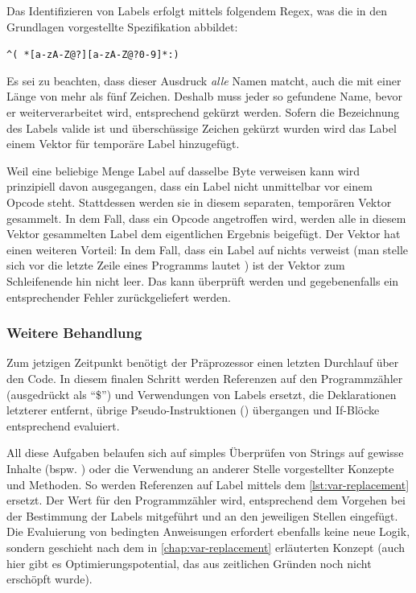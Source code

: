 Das Identifizieren von Labels erfolgt mittels folgendem Regex, was die in den Grundlagen vorgestellte Spezifikation abbildet:

\begin{center}
\texttt{\textasciicircum( *[a-zA-Z@?][a-zA-Z@?0-9]*:)}
\end{center}

Es sei zu beachten, dass dieser Ausdruck \textit{alle} Namen matcht, auch die mit einer Länge von mehr als fünf Zeichen. Deshalb muss jeder so gefundene Name, bevor er weiterverarbeitet wird, entsprechend gekürzt werden. Sofern die Bezeichnung des Labels valide ist und überschüssige Zeichen gekürzt wurden wird das Label einem Vektor für \glqq temporäre\grqq{} Label hinzugefügt.

Weil eine beliebige Menge Label auf dasselbe Byte verweisen kann wird prinzipiell davon ausgegangen, dass ein Label nicht unmittelbar vor einem Opcode steht. Stattdessen werden sie in diesem separaten, \glqq temporären\grqq{} Vektor gesammelt. In dem Fall, dass ein Opcode angetroffen wird, werden alle in diesem Vektor gesammelten Label dem eigentlichen Ergebnis beigefügt. Der Vektor hat einen weiteren Vorteil: In dem Fall, dass ein Label auf nichts verweist (man stelle sich vor die letzte Zeile eines Programms lautet ) ist der Vektor zum Schleifenende hin nicht leer. Das kann überprüft werden und gegebenenfalls ein entsprechender Fehler zurückgeliefert werden.

\subsubsection{Weitere Behandlung}

Zum jetzigen Zeitpunkt benötigt der Präprozessor einen letzten Durchlauf über den Code. In diesem finalen Schritt werden Referenzen auf den Programmzähler (ausgedrückt als \enquote{\$}) und Verwendungen von Labels ersetzt, die Deklarationen letzterer entfernt, übrige Pseudo-Instruktionen () übergangen und If-Blöcke entsprechend evaluiert.

All diese Aufgaben belaufen sich auf simples Überprüfen von Strings auf gewisse Inhalte (bspw. ) oder die Verwendung an anderer Stelle vorgestellter Konzepte und Methoden. So werden Referenzen auf Label mittels dem \cref{lst:var-replacement} ersetzt. Der Wert für den Programmzähler wird, entsprechend dem Vorgehen bei der Bestimmung der Labels mitgeführt und an den jeweiligen Stellen eingefügt. Die Evaluierung von bedingten Anweisungen erfordert ebenfalls keine neue Logik, sondern geschieht nach dem in \ref{chap:var-replacement} erläuterten Konzept (auch hier gibt es Optimierungspotential, das aus zeitlichen Gründen noch nicht erschöpft wurde).

